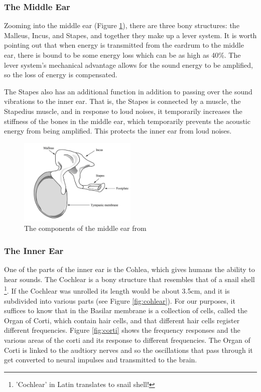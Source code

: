 \documentclass[logo,bsc,singlespacing,parskip,online]{infthesis}
\begin{document}
\subsubsection{The Middle Ear}
Zooming into the middle ear (Figure \ref{fig:middle-ear}), there are three bony structures: the Malleus, Incus, and Stapes,
and together they make up a lever system. 
It is worth pointing out that when energy is transmitted from the eardrum to the middle ear, there is bound to be some energy loss which can be as high as 40\%. The lever system's mechanical advantage 
allows for the sound energy to be amplified, so the loss of energy is compensated. 

The Stapes also has an additional function in addition to passing over the sound vibrations to the inner ear. That is,
the Stapes is connected by a muscle, the Stapedius muscle, and in response to loud noises, it temporarily increases the stiffness of the bones in the middle ear, which temporarily prevents the acoustic energy from being amplified. This 
protects the inner ear from loud noises.

\begin{figure}[h]
   \centering
   \includegraphics[width=0.5\textwidth]{wayland-middle-ear.png}
   \caption{The components of the middle ear from \citet{Wayland2018Phonetics}}
   \label{fig:middle-ear}
\end{figure}

\subsubsection{The Inner Ear}
One of the parts of the inner ear is the Cohlea, which gives humans the ability to hear sounds.
The Cochlear is a bony structure that resembles that of a snail shell \footnote{'Cochlear' in Latin translates to snail shell!}.
If the Cochlear was unrolled its length would be about 3.5cm, and it is subdivided into various parts (see Figure \ref{fig:cohlear}).
For our purposes, it suffices to know that in the Basilar membrane is a collection of cells, called 
the Organ of Corti, which contain hair cells, and that different hair cells register different frequencies.
Figure \ref{fig:corti} shows the frequency responses and the various areas of the corti 
and its response to different frequencies. The Organ of Corti is linked to the audtiory nerves and 
so the oscillations that pass through it get converted to neural impulses and transmitted to the brain.
\end{document}

